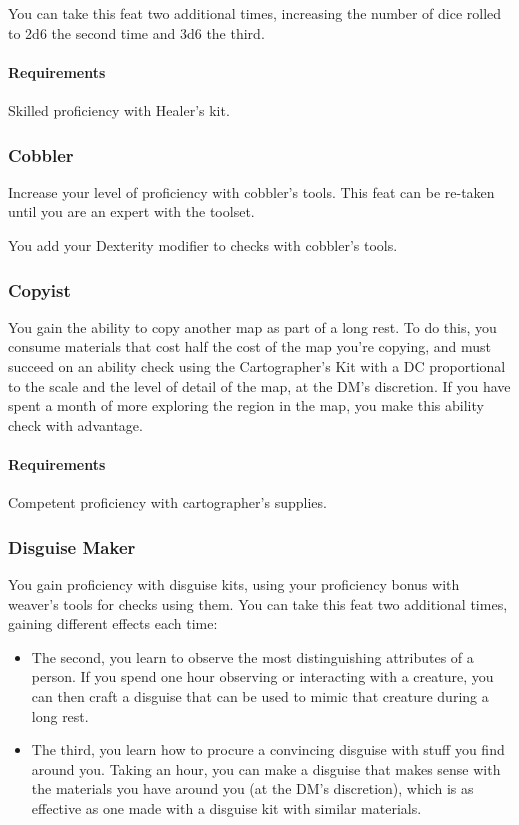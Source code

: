     You can take this feat two additional times, increasing the number of dice rolled to 2d6 the second time and 3d6 the third.
    \paragraph{Requirements} Skilled proficiency with Healer's kit.
\subsubsection{Cobbler} \label{feat::cobbler}
    Increase your level of proficiency with cobbler's tools.
    This feat can be re-taken until you are an expert with the toolset.

    You add your Dexterity modifier to checks with cobbler's tools.
\subsubsection{Copyist} \label{feat::copyist}
    You gain the ability to copy another map as part of a long rest.
    To do this, you consume materials that cost half the cost of the map you're copying, and must succeed on an ability check using the Cartographer's Kit with a DC proportional to the scale and the level of detail of the map, at the DM's discretion.
    If you have spent a month of more exploring the region in the map, you make this ability check with advantage.
    \paragraph{Requirements} Competent proficiency with cartographer's supplies.
\subsubsection{Disguise Maker} \label{feat::disguisemaker}
    You gain proficiency with disguise kits, using your proficiency bonus with weaver's tools for checks using them.
    You can take this feat two additional times, gaining different effects each time:
    \begin{itemize}
        \item The second, you learn to observe the most distinguishing attributes of a person.
        If you spend one hour observing or interacting with a creature, you can then craft a disguise that can be used to mimic that creature during a long rest.
        \item The third, you learn how to procure a convincing disguise with stuff you find around you.
        Taking an hour, you can make a disguise that makes sense with the materials you have around you (at the DM's discretion), which is as effective as one made with a disguise kit with similar materials.
    \end{itemize}
